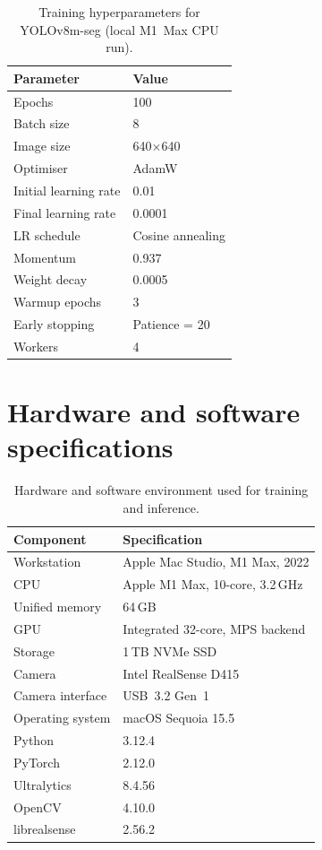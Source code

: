 \documentclass{Academic}
\begin{document}
\begin{appendices}
\begin{table}[H]
  \centering
  \begin{tabular}{ll}
    \toprule
    \textbf{Parameter} & \textbf{Value} \\
    \midrule
    Epochs           & 100 \\
    Batch size       & 8 \\
    Image size       & 640$\times$640 \\
    Optimiser        & AdamW \\
    Initial learning rate & 0.01 \\
    Final learning rate   & 0.0001 \\
    LR schedule      & Cosine annealing \\
    Momentum         & 0.937 \\
    Weight decay     & 0.0005 \\
    Warmup epochs    & 3 \\
    Early stopping   & Patience = 20 \\
    Workers          & 4 \\
    \bottomrule
  \end{tabular}
  \caption{Training hyperparameters for YOLOv8m-seg (local M1~Max CPU run).}
\end{table}

\section{Hardware and software specifications}
\label{app:hardware}

\begin{table}[H]
  \centering
  \begin{tabular}{ll}
    \toprule
    \textbf{Component} & \textbf{Specification} \\
    \midrule
    Workstation       & Apple Mac Studio, M1 Max, 2022 \\
    CPU               & Apple M1 Max, 10-core, 3.2\,GHz \\
    Unified memory    & 64\,GB \\
    GPU               & Integrated 32-core, MPS backend \\
    Storage           & 1\,TB NVMe SSD \\
    Camera            & Intel RealSense D415 \\
    Camera interface  & USB~3.2 Gen~1 \\
    \midrule
    Operating system  & macOS Sequoia 15.5 \\
    Python            & 3.12.4 \\
    PyTorch           & 2.12.0 \\
    Ultralytics       & 8.4.56 \\
    OpenCV            & 4.10.0 \\
    librealsense      & 2.56.2 \\
    \bottomrule
  \end{tabular}
  \caption{Hardware and software environment used for training and inference.}
\end{table}

\end{appendices}
\end{document}
